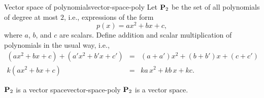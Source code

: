 \begin{example}{Vector space of polynomials}{vector-space-poly}
  Let $\mathbf{P}_2$%
   be the set of all polynomials%
   of degree at most $2$, i.e., expressions of the
  form
  \begin{equation*}
    p(x) = ax^2 + bx + c,
  \end{equation*}
  where $a$, $b$, and $c$ are scalars. Define addition%
   and scalar multiplication%
   of polynomials in the
  usual way, i.e.,
  \begin{eqnarray*}
    (ax^2 + bx + c) + (a'x^2 + b'x + c') &=& (a + a')x^2 + (b + b')x + (c + c') \\
    k(ax^2 + bx + c) &=& ka\,x^2 + kb\,x + kc.
  \end{eqnarray*}
\end{example}

\begin{proposition}{$\mathbf{P}_2$ is a vector space}{vector-space-poly}
  $\mathbf{P}_2$ is a vector space.
\end{proposition}

